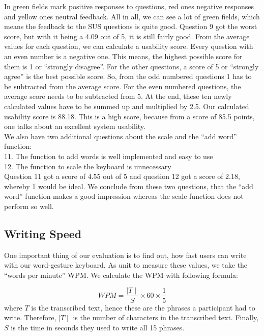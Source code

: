 In  green fields mark positive responses to questions, red ones negative responses and yellow ones neutral feedback. All in all, we can see a lot of green fields, which means the feedback to the SUS questions is quite good. Question 9 got the worst score, but with it being a 4.09 out of 5, it is still fairly good. From the average values for each question, we can calculate a usability score. Every question with an even number is a negative one. This means, the highest possible score for them is 1 or ``strongly disagree''. For the other questions, a score of 5 or ``strongly agree'' is the best possible score. So, from the odd numbered questions 1 has to be subtracted from the average score. For the even numbered questions, the average score needs to be subtracted from 5. At the end, these ten newly calculated values have to be summed up and multiplied by 2.5. Our calculated usability score is 88.18. This is a high score, because from a score of 85.5 points, one talks about an excellent system usability.\\
We also have two additional questions about the scale and the ``add word'' function:\\
11. The function to add words is well implemented and easy to use\\
12. The function to scale the keyboard is unnecessary\\
Question 11 got a score of 4.55 out of 5 and question 12 got a score of 2.18, whereby 1 would be ideal. We conclude from these two questions, that the ``add word'' function makes a good impression whereas the scale function does not perform so well.\\

\subsection{Writing Speed}
One important thing of our evaluation is to find out, how fast users can write with our word-gesture keyboard. As unit to measure these values, we take the ``words per minute'' WPM. We calculate the WPM with following formula: 

\begin{equation}
    WPM = \frac{\mid T \mid}{S} \times 60 \times \frac{1}{5}
\end{equation}
where $T$ is the transcribed text, hence these are the phrases a participant had to write. Therefore, $\mid T \mid$ is the number of characters in the transcribed text. Finally, $S$ is the time in seconds they used to write all 15 phrases.\\

